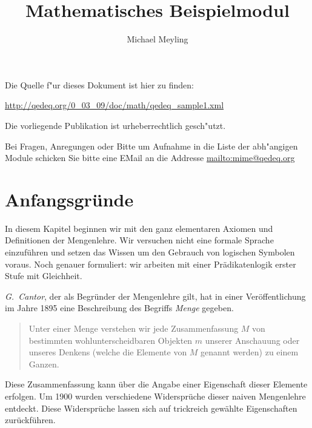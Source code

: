 \documentclass[a4paper,german,10pt,twoside]{book}
\title{Mathematisches Beispielmodul}
\author{
Michael Meyling
}
\theoremstyle{definition}
\theoremstyle{remark}
\begin{document}
\maketitle

\setlength{\parskip}{5pt plus 2pt minus 1pt}
\mbox{}
\vfill

\par
Die Quelle f{"ur} dieses Dokument ist hier zu finden:
\par
\url{http://qedeq.org/0_03_09/doc/math/qedeq_sample1.xml}

\par
Die vorliegende Publikation ist urheberrechtlich gesch{"u}tzt.
\par
Bei Fragen, Anregungen oder Bitte um Aufnahme in die Liste der abh{"a}ngigen Module schicken Sie bitte eine EMail an die Addresse \url{mailto:mime@qedeq.org}

\setlength{\parskip}{0pt}
\tableofcontents

\setlength{\parskip}{5pt plus 2pt minus 1pt}

\chapter{Anfangsgr{\"u}nde} \label{chapter0} \hypertarget{chapter0}{}

In diesem Kapitel beginnen wir mit den ganz elementaren Axiomen und Definitionen der Mengenlehre. Wir versuchen nicht eine formale Sprache einzuf{\"u}hren und setzen das Wissen um den Gebrauch von logischen Symbolen voraus. Noch genauer formuliert: wir arbeiten mit einer Pr{\"a}dikatenlogik erster Stufe mit Gleichheit.

\par
\emph{G.~Cantor}, der als Begr{\"u}nder der Mengenlehre gilt, hat in einer Ver{\"o}ffentlichung im Jahre 1895 eine Beschreibung des Begriffs \emph{Menge} gegeben.

\begin{quote}
 Unter einer {\glqq Menge\grqq} verstehen wir jede Zusammenfassung $M$ von bestimmten wohlunterscheidbaren Objekten $m$ unserer Anschauung oder unseres Denkens (welche die {\glqq Elemente\grqq} von $M$ genannt werden) zu einem Ganzen.
\end{quote}

\par
Diese Zusammenfassung kann {\"u}ber die Angabe einer Eigenschaft dieser Elemente erfolgen. Um 1900 wurden verschiedene Widerspr{\"u}che dieser naiven Mengenlehre entdeckt. Diese Widerspr{\"u}che lassen sich auf trickreich gew{\"a}hlte Eigenschaften zur{\"u}ckf{\"u}hren.
\end{document}
